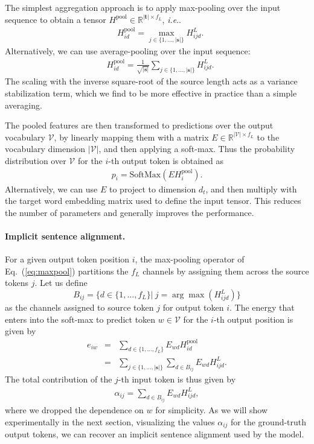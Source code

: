 \documentclass[11pt,a4paper]{article}
\makeatletter
\DeclareRobustCommand\onedot{\futurelet\@let@token\@onedot}
\def\@onedot{\ifx\@let@token.\else.\null\fi\xspace}
\def\ie{\emph{i.e}\onedot} \def\Ie{\emph{I.e}\onedot}
\def\Eq#1{Eq.~(\ref{eq:#1})}
\newcommand{\lsrc}{{|\boldsymbol s|}}
\newcommand{\ltrg}{{|\boldsymbol t|}}
\newcommand{\V}{\mathcal V}
\newcommand{\R}{\mathbb{R}}
\makeatother
\begin{document}
The simplest aggregation approach is to apply max-pooling over the input sequence to obtain a tensor $H^\text{pool}\in\R^{\ltrg\times f_L}$, \ie 
\begin{align}
    &H_{id}^\text{pool}= \max_{j\in\{1,\dots,\lsrc\}}H^L_{ijd}. \label{eq:maxpool}
\end{align}
Alternatively, we can use average-pooling over the input sequence:
\begin{align}
    &H_{id}^\text{pool}= \frac{1}{\sqrt{\lsrc}}\sum_{j\in\{1,\dots,\lsrc\}}H^L_{ijd}.
    \label{eq:avgpool}
\end{align}
The scaling with the inverse square-root of the source length acts as a variance stabilization term, which we find to be more effective in practice than a simple averaging.

The pooled features are then transformed to predictions over the output vocabulary $\V$, 
by linearly mapping them with a matrix $E\in\R^{|\V|\times f_L}$ to the vocabulary dimension $|\V|$, and then applying a soft-max. 
Thus the probability distribution over $\V$ for the $i$-th output token is obtained as 
\begin{align}
p_i = \text{SoftMax}(EH_i^\text{pool}).
\end{align}
Alternatively, we can use $E$ to project to dimension $d_t$, and then multiply with the target word embedding matrix used to define the input tensor. 
This reduces the number of parameters and generally improves the performance.





\paragraph{Implicit sentence alignment.} \label{para:align}
For a given output token position $i$, the max-pooling operator of \Eq{maxpool} partitions the $f_L$ channels 
by assigning them across the source tokens $j$.  
Let us define 
\[B_{ij}=\{ d\in \{1,\ldots, f_L\} |\: j=\arg\max(H^L_{ijd}) \}\]
as the channels assigned to source token $j$ for output token $i$.
The energy that enters into the soft-max to predict token $w\in\V$ for the $i$-th output position is given by 
\begin{eqnarray}
e_{iw} & = &  \sum_{d \in\{1,\dots,f_L\}}  E_{wd} H^\text{pool}_{id} \\
 & = & \sum_{j\in\{1,\dots,\lsrc\}} \sum_{d\in B_{ij}} E_{wd} H^L_{ijd}.
\end{eqnarray}
The total contribution of the $j$-th input token is thus given by 
\begin{align}
\alpha_{ij} = \sum_{d\in B_{ij}} E_{wd} H^L_{ijd},
\label{eq:implicit}
\end{align}
where we dropped the dependence on $w$ for simplicity. 
As we will show experimentally in the next section, visualizing the values $\alpha_{ij}$ for the ground-truth output tokens, we can recover an implicit sentence alignment used by the model.
\end{document}
